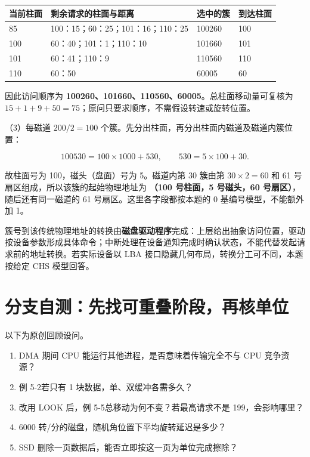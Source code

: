 \begin{wideblock}

\par\medskip\noindent\begin{minipage}{\linewidth}\fontsize{9.3}{12}\selectfont\begin{tabularx}{\linewidth}{@{}YYYY@{}}
\toprule\noalign{}
当前柱面 & 剩余请求的柱面与距离 & 选中的簇 & 到达柱面 \\
\midrule\noalign{}


85 & 100：15；60：25；101：16；110：25 & 100260 & 100 \\
100 & 60：40；101：1；110：10 & 101660 & 101 \\
101 & 60：41；110：9 & 110560 & 110 \\
110 & 60：50 & 60005 & 60 \\
\bottomrule\end{tabularx}
\end{minipage}\par\medskip

\end{wideblock}

因此访问顺序为 \textbf{100260、101660、110560、60005}。总柱面移动量可复核为 \(15+1+9+50=75\)；原问只要求顺序，不需假设转速或旋转位置。

（3）每磁道 \(200/2=100\) 个簇。先分出柱面，再分出柱面内磁道及磁道内簇位置：

\[100530=100\times1000+530,\qquad530=5\times100+30.\]

故柱面号为 100，磁头（盘面）号为 5。磁道内第 30 簇由第 \(30\times2=60\) 和 61 号扇区组成，所以该簇的起始物理地址为 \textbf{（100 号柱面，5 号磁头，60 号扇区）}，随后还有同一磁道的 61 号扇区。这里各字段都按本题的 0 基编号模型，不能额外加 1。

簇号到该传统物理地址的转换由\textbf{磁盘驱动程序}完成：上层给出抽象访问位置，驱动按设备参数形成具体命令；中断处理在设备通知完成时确认状态，不能代替发起请求前的地址转换。若实际设备以 LBA 接口隐藏几何布局，转换分工可不同，本题按给定 CHS 模型回答。

\section{分支自测：先找可重叠阶段，再核单位}\label{OS05-7-review}

以下为原创回顾设问。

\begin{enumerate}
\def\labelenumi{\arabic{enumi}.}
\tightlist
\item
  DMA 期间 CPU 能运行其他进程，是否意味着传输完全不与 CPU 竞争资源？
\item
  例 5-2若只有 1 块数据，单、双缓冲各需多久？
\item
  改用 LOOK 后，例 5-5总移动为何不变？若最高请求不是 199，会影响哪里？
\item
  6000 转/分的磁盘，随机角位置下平均旋转延迟是多少？
\item
  SSD 删除一页数据后，能否立即按这一页为单位完成擦除？
\end{enumerate}

